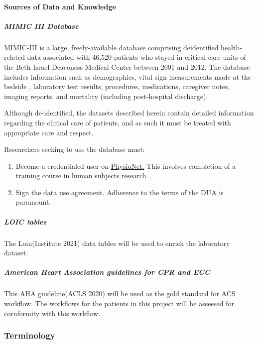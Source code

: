 \documentclass[
]{article}
\providecommand{\tightlist}{%
  \setlength{\itemsep}{0pt}\setlength{\parskip}{0pt}}
\begin{document}
\hypertarget{sources-of-data-and-knowledge}{%
\paragraph{Sources of Data and
Knowledge}\label{sources-of-data-and-knowledge}}

\hypertarget{mimic-iii-database}{%
\subparagraph{MIMIC III Database}\label{mimic-iii-database}}

MIMIC-III is a large, freely-available database comprising deidentified
health-related data associated with 46,520 patients who stayed in
critical care units of the Beth Israel Deaconess Medical Center between
2001 and 2012. The database includes information such as demographics,
vital sign measurements made at the bedside , laboratory test results,
procedures, medications, caregiver notes, imaging reports, and mortality
(including post-hospital discharge).

Although de-identified, the datasets described herein contain detailed
information regarding the clinical care of patients, and as such it must
be treated with appropriate care and respect.

Researchers seeking to use the database must:

\begin{enumerate}
\def\labelenumi{\arabic{enumi}.}
\tightlist
\item
  Become a credentialed user on
  \href{https://physionet.org/}{PhysioNet.} This involves completion of
  a training course in human subjects research.
\item
  Sign the data use agreement. Adherence to the terms of the DUA is
  paramount.
\end{enumerate}

\hypertarget{loic-tables}{%
\subparagraph{LOIC tables}\label{loic-tables}}

The Loin(Institute 2021) data tables will be used to enrich the
laboratory dataset.

\hypertarget{american-heart-association-guidelines-for-cpr-and-ecc}{%
\subparagraph{American Heart Association guidelines for CPR and
ECC}\label{american-heart-association-guidelines-for-cpr-and-ecc}}

This AHA guideline(ACLS 2020) will be used as the gold standard for ACS
workflow. The workflows for the patients in this project will be
assessed for cornformity with this workflow.

\hypertarget{terminology}{%
\subsubsection{Terminology}\label{terminology}}
\end{document}
